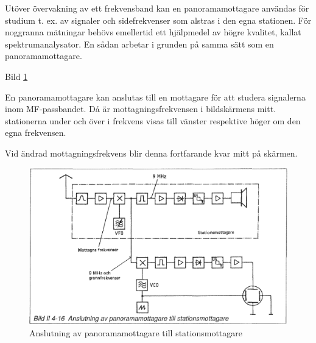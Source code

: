 Utöver övervakning av ett frekvensband kan en panoramamottagare
användas för studium t. ex. av signaler och sidefrekvenser som alstras
i den egna stationen. För noggranna mätningar behövs emellertid ett
hjälpmedel av högre kvalitet, kallat spektrumanalysator. En sådan
arbetar i grunden på samma sätt som en panoramamottagare.

Bild \ref{fig:bildII4-16}

En panoramamottagare kan anslutas till en mottagare för att studera
signalerna inom MF-passbandet. Då är mottagningsfrekvensen i
bildskärmens mitt. stationerna under och över i frekvens visas till
vänster respektive höger om den egna frekvensen.

Vid ändrad mottagningsfrekvens blir denna fortfarande kvar mitt på
skärmen.

\begin{figure}
  \includegraphics[width=\textwidth]{images/bild_2_4-16}
  \caption{Anslutning av panoramamottagare till stationsmottagare}
  \label{fig:bildII4-16}
\end{figure}
